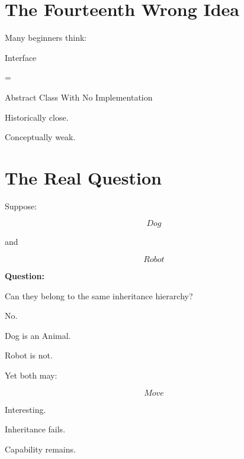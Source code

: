 \documentclass[11pt,a4paper]{book}
\begin{document}

\section{The Fourteenth Wrong Idea}

\begin{trap}

Many beginners think:

Interface

=

Abstract Class With No Implementation

Historically close.

Conceptually weak.

\end{trap}


\section{The Real Question}

Suppose:

\[
Dog
\]

and

\[
Robot
\]


\textbf{Question:}

Can they belong to the same inheritance hierarchy?


No.


Dog is an Animal.

Robot is not.


Yet both may:

\[
Move
\]


Interesting.


Inheritance fails.

Capability remains.
\end{document}
